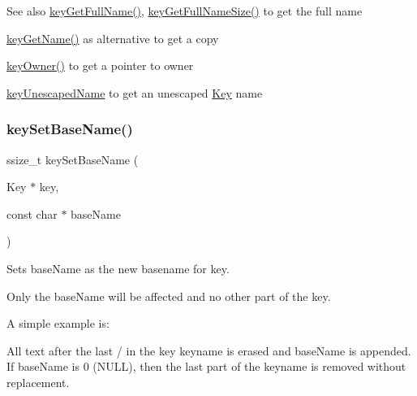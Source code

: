 \begin{DoxyItemize}
\begin{DoxySeeAlso}{See also}
\mbox{\hyperlink{group__keyname_gaaba1494a5ffc976e0e56c43f4334a23c}{key\+Get\+Full\+Name()}}, \mbox{\hyperlink{group__keyname_gab65dc9d43d3ee08d5e936a20ebbddd23}{key\+Get\+Full\+Name\+Size()}} to get the full name 

\mbox{\hyperlink{group__keyname_gab29a850168d9b31c9529e90cf9ab68be}{key\+Get\+Name()}} as alternative to get a copy 

\mbox{\hyperlink{owner_8c_af6485fb8599714b6bbd830cf915ffea5}{key\+Owner()}} to get a pointer to owner 

\mbox{\hyperlink{group__keyname_ga6fe6af4c27b35d911a533f4ae4d698bb}{key\+Unescaped\+Name}} to get an unescaped \mbox{\hyperlink{group__key}{Key}} name 
\end{DoxySeeAlso}

\end{DoxyItemize}\mbox{\label{group__keyname_ga6e804bd453f98c28b0ff51430d1df407}} 
\subsubsection{\texorpdfstring{keySetBaseName()}{keySetBaseName()}}
{\footnotesize\ttfamily ssize\+\_\+t key\+Set\+Base\+Name (\begin{DoxyParamCaption}\item[{Key $\ast$}]{key,  }\item[{const char $\ast$}]{base\+Name }\end{DoxyParamCaption})}



Sets {\ttfamily base\+Name} as the new basename for {\ttfamily key}. 

Only the base\+Name will be affected and no other part of the key.

A simple example is\+: 
\begin{DoxyCodeInclude}{0}
\end{DoxyCodeInclude}
 All text after the last {\ttfamily \textquotesingle{}/\textquotesingle{}} in the {\ttfamily key} keyname is erased and {\ttfamily base\+Name} is appended. If {\ttfamily base\+Name} is 0 (N\+U\+LL), then the last part of the keyname is removed without replacement.

